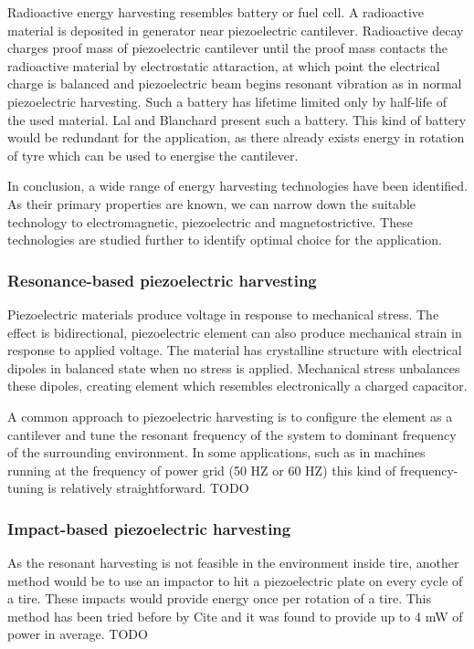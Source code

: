 Radioactive energy harvesting resembles battery or fuel cell. A radioactive material is deposited in generator near piezoelectric cantilever. Radioactive decay charges proof mass of piezoelectric cantilever until the proof mass contacts the radioactive material by electrostatic attaraction, at which point the electrical charge is balanced and piezoelectric beam begins resonant vibration as in normal piezoelectric harvesting. Such a battery has lifetime limited only by half-life of the used material. Lal and Blanchard \cite{Lal2004} present such a battery. This kind of battery would be redundant for the application, as there already exists energy in rotation of tyre which can be used to energise the cantilever. 

In conclusion, a wide range of energy harvesting technologies have been identified. As their primary properties are known, we can narrow down the suitable technology to electromagnetic, piezoelectric and magnetostrictive. These technologies are studied further to identify optimal choice for the application.

\subsubsection{Resonance-based piezoelectric harvesting}
Piezoelectric materials produce voltage in response to mechanical stress. The effect is bidirectional, piezoelectric element can also produce mechanical strain in response to applied voltage. The material has crystalline structure with electrical dipoles in balanced state when no stress is applied. Mechanical stress unbalances these dipoles, creating element which resembles electronically a charged capacitor. 

A common approach to piezoelectric harvesting is to configure the element as a cantilever and tune the resonant frequency of the system to dominant frequency of the surrounding environment. In some applications, such as in machines running at the frequency of power grid (50 HZ or 60 HZ) this kind of frequency-tuning is relatively straightforward. TODO

\subsubsection{Impact-based piezoelectric harvesting}
As the resonant harvesting is not feasible in the environment inside tire, another method would be to use an impactor to hit a piezoelectric plate on every cycle of a tire. These impacts would provide energy once per rotation of a tire. This method has been tried before by {\color{red} Cite} and it was found to provide up to 4 mW of power in average. TODO

